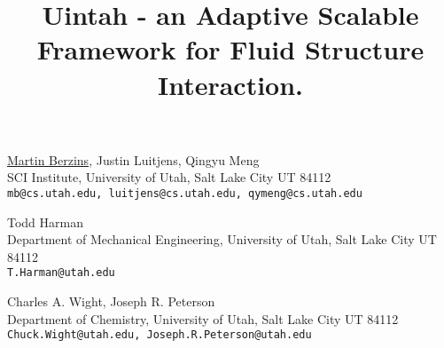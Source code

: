 


\title{Uintah - an Adaptive Scalable Framework for Fluid Structure Interaction.}
\author{} \institute{} %
\maketitle
\begin{center}
\vspace{-4mm} %
{\underline {Martin Berzins}, {Justin Luitjens}, {Qingyu Meng}}\\
SCI Institute, University of Utah, Salt Lake City UT 84112\\
{\tt mb@cs.utah.edu, luitjens@cs.utah.edu,  qymeng@cs.utah.edu}

{\large {Todd Harman}}\\
Department of Mechanical Engineering, University of Utah, Salt Lake City UT 84112\\
{\tt T.Harman@utah.edu}

{\large { Charles A. Wight, Joseph R. Peterson}}\\
Department of Chemistry, University of Utah, Salt Lake City UT 84112\\
{\tt Chuck.Wight@utah.edu, Joseph.R.Peterson@utah.edu}
\vspace{-4mm} %
\end{center}

